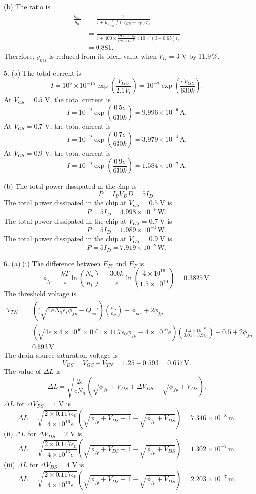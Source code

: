 \documentclass[a4paper]{article}
\begin{document}
(b) The ratio is
\[
    \begin{aligned}
        \frac{g_m'}{g_m}&=\frac{1}{1+\mu_n\frac{\epsilon}{t_\text{ox}}\frac{W}{L}(V_{GS}-V_T)r_s}\\
        &=\frac{1}{1+400\times\frac{3.9\times0.01\epsilon_0}{4.75\times10^{-6}}\times10\times(3-0.65)r_s}\\
        &=0.881.
    \end{aligned}
\]
Therefore, $g_{ms}$ is reduced from its ideal value when $V_G=3$ V by 11.9\,\%.

5. (a) The total current is
\[I=10^6\times10^{-15}\exp{\left(\frac{V_{GS}}{2.1V_t}\right)}=10^{-9}\exp{\left(\frac{eV_{GS}}{630k}\right)}.\]
At $V_{GS}=0.5$ V, the total current is
\[I=10^{-9}\exp{\left(\frac{0.5e}{630k}\right)}=9.996\times10^{-6}\,\text{A}.\]
At $V_{GS}=0.7$ V, the total current is
\[I=10^{-9}\exp{\left(\frac{0.7e}{630k}\right)}=3.979\times10^{-4}\,\text{A}.\]
At $V_{GS}=0.9$ V, the total current is
\[I=10^{-9}\exp{\left(\frac{0.9e}{630k}\right)}=1.584\times10^{-2}\,\text{A}.\]

(b) The total power dissipated in the chip is
\[P=I_DV_DD=5I_D.\]
The total power dissipated in the chip at $V_{GS}=0.5$ V is
\[P=5I_D=4.998\times10^{-5}\,\text{W}.\]
The total power dissipated in the chip at $V_{GS}=0.7$ V is
\[P=5I_D=1.989\times10^{-3}\,\text{W}.\]
The total power dissipated in the chip at $V_{GS}=0.9$ V is
\[P=5I_D=7.919\times10^{-2}\,\text{W}.\]

6. (a) (i) The difference between $E_{Fi}$ and $E_F$ is
\[\phi_{fp}=\frac{kT}{e}\ln{\left(\frac{N_a}{n_i}\right)}=\frac{300k}{e}\ln{\left(\frac{4\times10^{16}}{1.5\times10^{10}}\right)}=0.3825\,\text{V}.\]
The threshold voltage is
\[
    \begin{aligned}
        V_{TN}&=\left((\sqrt{4eN_a\epsilon_s\phi_{fp}}-Q_{ss}'\right)\left(\frac{t_\text{ox}}{\epsilon_\text{ox}}\right)+\phi_{ms}+2\phi_{fp}\\
        &=\left(\sqrt{4e\times4\times10^{16}\times0.01\times11.7\epsilon_0\phi_{fp}}-4\times10^{10}e\right)\left(\frac{1.2\times10^{-6}}{0.01\times3.9\epsilon_0}\right)-0.5+2\phi_{fp}\\
        &=0.593\,\text{V}.
    \end{aligned}
\]
The drain-source saturation voltage is
\[V_{DS}=V_{GS}-V_{TN}=1.25-0.593=0.657\,\text{V}.\]
The value of $\Delta L$ is
\[\Delta L=\sqrt{\frac{2\epsilon}{eN_a}}\left(\sqrt{\phi_{fp}+V_{DS}+\Delta V_{DS}}-\sqrt{\phi_{fp}+V_{DS}}\right).\]
$\Delta L$ for $\Delta V_{DS}=1$ V is
\[\Delta L=\sqrt{\frac{2\times0.117\epsilon_0}{4\times10^{16}e}}\left(\sqrt{\phi_{fp}+V_{DS}+1}-\sqrt{\phi_{fp}+V_{DS}}\right)=7.346\times10^{-8}\,\text{m}.\]
(ii) $\Delta L$ for $\Delta V_{DS}=2$ V is
\[\Delta L=\sqrt{\frac{2\times0.117\epsilon_0}{4\times10^{16}e}}\left(\sqrt{\phi_{fp}+V_{DS}+1}-\sqrt{\phi_{fp}+V_{DS}}\right)=1.302\times10^{-7}\,\text{m}.\]
(iii) $\Delta L$ for $\Delta V_{DS}=4$ V is
\[\Delta L=\sqrt{\frac{2\times0.117\epsilon_0}{4\times10^{16}e}}\left(\sqrt{\phi_{fp}+V_{DS}+1}-\sqrt{\phi_{fp}+V_{DS}}\right)=2.203\times10^{-7}\,\text{m}.\]
\end{document}
